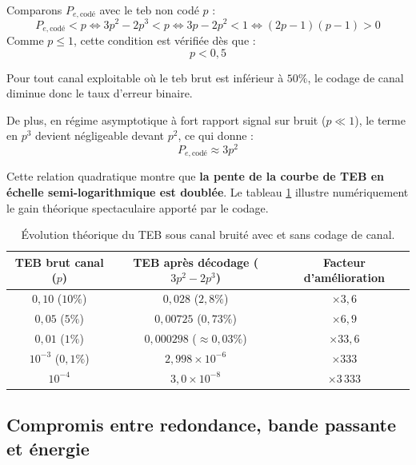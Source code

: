 \documentclass[a4paper,12pt]{report}
\begin{document}
Comparons $P_{e,\text{codé}}$ avec le \gls{teb} non codé $p$ :
\[
    P_{e,\text{codé}} < p \iff 3p^2 - 2p^3 < p \iff 3p - 2p^2 < 1 \iff (2p - 1)(p - 1) > 0
\]
Comme $p \le 1$, cette condition est vérifiée dès que :
\[
    p < 0{,}5
\]

Pour tout canal exploitable où le \gls{teb} brut est inférieur à $50\%$, le codage de canal diminue donc le taux d'erreur binaire. 

De plus, en régime asymptotique à fort rapport signal sur bruit ($p \ll 1$), le terme en $p^3$ devient négligeable devant $p^2$, ce qui donne :
\[
    P_{e,\text{codé}} \approx 3 p^2
\]

Cette relation quadratique montre que \textbf{la pente de la courbe de TEB en échelle semi-logarithmique est doublée}. Le tableau \ref{tab:theorie_teb_gain} illustre numériquement le gain théorique spectaculaire apporté par le codage.

\begin{table}[H]
\centering
\begin{tabular}{|c|c|c|}
\hline
\textbf{TEB brut canal ($p$)} & \textbf{TEB après décodage ($3p^2 - 2p^3$)} & \textbf{Facteur d'amélioration} \\
\hline
$0{,}10$ ($10\%$) & $0{,}028$ ($2{,}8\%$) & $\times 3{,}6$ \\
$0{,}05$ ($5\%$) & $0{,}00725$ ($0{,}73\%$) & $\times 6{,}9$ \\
$0{,}01$ ($1\%$) & $0{,}000298$ ($\approx 0{,}03\%$) & $\times 33{,}6$ \\
$10^{-3}$ ($0{,}1\%$) & $2{,}998 \times 10^{-6}$ & $\times 333$ \\
$10^{-4}$ & $3{,}0 \times 10^{-8}$ & $\times 3\,333$ \\
\hline
\end{tabular}
\caption{Évolution théorique du TEB sous canal bruité avec et sans codage de canal.}
\label{tab:theorie_teb_gain}
\end{table}

\subsection{Compromis entre redondance, bande passante et énergie}
\end{document}
